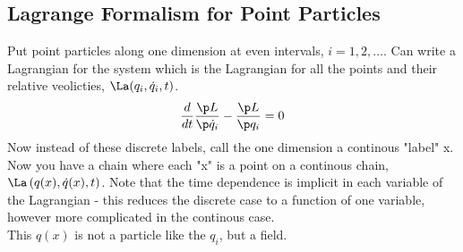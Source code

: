 \documentclass[a4paper, 11pt, normalem]{report}
\begin{document}
\chapter{}
\section{Lagrange Formalism for Point Particles}
Put point particles along one dimension at even intervals, $i=1,2,\dots$.
Can write a Lagrangian for the system which is the Lagrangian for all the points and their relative veolicties, $\La(q_i,\dot{q}_i,t)$.
\begin{align}
    \frac{d}{dt}\frac{\p L}{\p \dot{q}_i} - \frac{\p L}{\p q_i} = 0
\end{align}
Now instead of these discrete labels, call the one dimension a continous "label" x.
Now you have a chain where each "x" is a point on a continous chain, $\La\left(q(x),\dot{q}(x),t\right)$.
Note that the time dependence is implicit in each variable of the Lagrangian - this reduces the discrete case to a function of one variable, however more complicated in the continous case. \\
This $q(x)$ is not a particle like the $q_i$, but a field.
\end{document}
